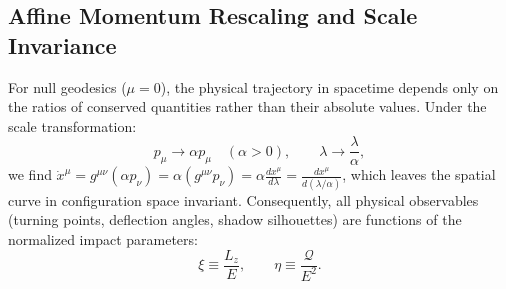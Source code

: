 \subsection{Affine Momentum Rescaling and Scale Invariance}
For null geodesics ($\mu = 0$), the physical trajectory in spacetime depends only on the ratios of conserved quantities rather than their absolute values. Under the scale transformation:
\begin{equation}
    p_\mu \to \alpha p_\mu \quad (\alpha > 0), \qquad \lambda \to \frac{\lambda}{\alpha},
    \label{eq:scale_transformation}
\end{equation}
we find $\dot{x}^\mu = g^{\mu\nu} (\alpha p_\nu) = \alpha (g^{\mu\nu} p_\nu) = \alpha \frac{dx^\mu}{d\lambda} = \frac{dx^\mu}{d(\lambda/\alpha)}$, which leaves the spatial curve in configuration space invariant. Consequently, all physical observables (turning points, deflection angles, shadow silhouettes) are functions of the normalized impact parameters:
\begin{equation}
    \xi \equiv \frac{L_z}{E}, \qquad \eta \equiv \frac{\mathcal{Q}}{E^2}.
    \label{eq:impact_parameters_xi_eta}
\end{equation}
